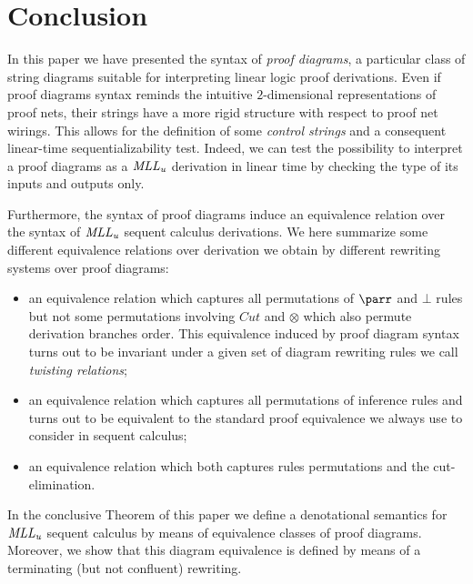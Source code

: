 \documentclass[a4paper]{article}
\begin{document}


\section{Conclusion}

In this paper we have presented the syntax of \emph{proof diagrams}, a particular class of string diagrams suitable for interpreting linear logic proof derivations. Even if proof diagrams syntax  reminds the intuitive $2$-dimensional representations of proof nets, their strings have a more  rigid structure with respect to proof net wirings. This allows for the definition of some \emph{control strings} and a consequent linear-time sequentializability test. Indeed,  we can test the possibility to interpret a proof diagrams as a $\mathit{MLL_u}$ derivation in linear time by checking the type of its inputs and outputs only.

Furthermore, the syntax of proof diagrams induce an equivalence relation over the syntax of $\mathit{MLL_u}$ sequent calculus derivations.  We here summarize some different equivalence relations over derivation we obtain by different rewriting systems over proof diagrams:


\begin{itemize}
\item an equivalence relation which captures all permutations of $\parr$ and $\bot$ rules but not some permutations involving $Cut$ and $\otimes$  which also permute derivation branches order. This equivalence induced by proof diagram syntax turns out to be invariant under a given set of diagram rewriting rules we call \emph{twisting relations};

\item an equivalence relation which captures all permutations of inference rules and turns out to be equivalent to the standard proof equivalence we always use to consider in sequent calculus;

\item an equivalence relation which both captures rules permutations and the cut-elimination. 

\end{itemize}

In the conclusive Theorem of this paper we define a  denotational semantics for $\mathit{MLL_u}$ sequent calculus by means of equivalence classes of proof diagrams. Moreover, we show that this diagram equivalence is defined by means of a terminating (but not confluent) rewriting.
%
\end{document}
